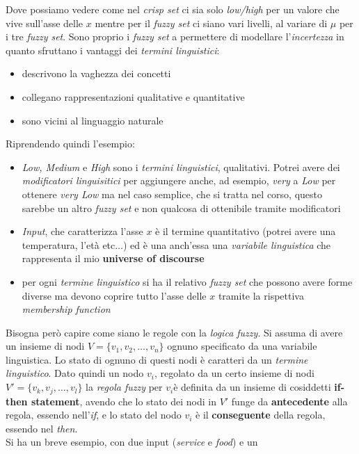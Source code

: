 \documentclass[a4paper,12pt, oneside]{book}
\begin{document}
Dove possiamo vedere come nel \textit{crisp set} ci sia solo \textit{low/high}
per un valore che vive sull'asse delle $x$ mentre per il \textit{fuzzy set} ci
siano vari livelli, al variare di $\mu$ per i tre \textit{fuzzy set}. Sono
proprio i \textit{fuzzy set} a permettere di modellare l'\textit{incertezza} in
quanto sfruttano i vantaggi dei \textit{termini linguistici}:
\begin{itemize}
  \item descrivono la vaghezza dei concetti
  \item collegano rappresentazioni qualitative e quantitative
  \item sono vicini al linguaggio naturale
\end{itemize}
Riprendendo quindi l'esempio:
\begin{itemize}
  \item \textit{Low, Medium} e \textit{High} sono i \textit{termini
    linguistici}, qualitativi. Potrei avere dei \textit{modificatori
    linguisitici} per aggiungere anche, ad esempio, \textit{very} a \textit{Low}
  per ottenere \textit{very Low} ma nel caso semplice, che si tratta nel corso,
  questo sarebbe un altro 
  \textit{fuzzy set} e non qualcosa di ottenibile tramite modificatori 
  \item \textit{Input}, che caratterizza l'asse $x$ è il termine quantitativo
  (potrei avere una temperatura, l'età etc$\ldots$) ed è una anch'essa una
  \textit{variabile 
    linguistica} che rappresenta il mio \textbf{universe of discourse}
  \item per ogni \textit{termine linguistico} si ha il relativo \textit{fuzzy
    set} che possono avere forme diverse ma devono coprire tutto l'asse delle
  $x$ tramite la rispettiva \textit{membership function}
\end{itemize}
Bisogna però capire come siano le regole con la \textit{logica fuzzy}. Si assuma
di avere un insieme di nodi $V=\{v_1,v_2,\ldots,v_n\}$ ognuno specificato da
una variabile linguistica. Lo stato di ognuno di questi nodi è
caratteri da un \textit{termine linguistico}. Dato quindi un nodo $v_i$,
regolato da un certo insieme di nodi $V'=\{v_k, v_j, \ldots, v_l\}$ la
\textit{regola fuzzy} per $v_i$è definita da un insieme di cosiddetti
\textbf{if-then statement}, avendo che lo stato dei nodi in $V'$ funge da
\textbf{antecedente} alla regola, essendo nell'\textit{if}, e lo stato del nodo
$v_i$ è il \textbf{conseguente} della regola, essendo nel \textit{then}.\\
Si ha un breve esempio, con due input (\textit{service} e \textit{food}) e un
\end{document}
